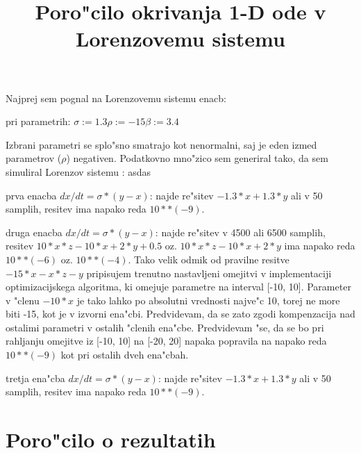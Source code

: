 \documentclass[10pt,a4paper]{article}
\title{Poro"cilo okrivanja 1-D ode v Lorenzovemu sistemu}
\begin{document}
	\maketitle
    
Najprej sem pognal na Lorenzovemu sistemu enacb:

pri parametrih:
$\sigma:=1.3 \rho:=-15 \beta:=3.4$

Izbrani parametri se splo"sno smatrajo kot nenormalni, saj je eden izmed parametrov
($\rho$) negativen.
Podatkovno mno"zico sem generiral tako, da sem simuliral Lorenzov sistemu
:
asdas

prva enacba  $dx/dt = \sigma*(y-x)$: najde re"sitev 
$ -1.3*x + 1.3*y$ ali 
v 50 samplih, resitev ima napako reda $10**(-9)$.


druga enacba  $dx/dt = \sigma*(y-x)$: najde re"sitev v 4500 ali 6500 samplih, resitev 
$10*x*z -10*x +2*y +0.5$ oz. $10*x*z -10*x +2*y$ ima napako
reda $10**(-6)$ oz. $10**(-4)$. Tako velik odmik od pravilne resitve  
$-15*x-x*z-y$ pripisujem trenutno nastavljeni omejitvi v implementaciji optimizacijskega
algoritma, ki omejuje parametre na interval [-10, 10]. Parameter v "clenu $-10*x$ je tako
lahko po absolutni vrednosti najve"c 10, torej ne more biti -15, kot je v izvorni ena"cbi.
Predvidevam, da se zato zgodi kompenzacija nad ostalimi parametri v ostalih "clenih ena"cbe.
Predvidevam "se, da se bo pri rahljanju omejitve iz [-10, 10] na [-20, 20] napaka popravila
na napako reda $10**(-9)$ kot pri ostalih dveh ena"cbah.

tretja ena"cba  $dx/dt = \sigma*(y-x)$: najde re"sitev 
$ -1.3*x + 1.3*y$ ali 
v 50 samplih, resitev ima napako
reda $10**(-9)$.



\section{Poro"cilo o rezultatih}
\newcommand{\asui}{rf-100,10  }
 \newcommand{\asuii}{glm        }
 \newcommand{\asuiii}{glm        }
 \newcommand{\asuiv}{squared+glm}
 \newcommand{\nui}{625}
 \newcommand{\nuii}{562}
 \newcommand{\nuiii}{500}
 \newcommand{\nuiv}{438}
 \newcommand{\eui}{0.00000}
 \newcommand{\euii}{0.00000}
 \newcommand{\euiii}{0.00000}
 \newcommand{\euiv}{0.00000}
 \newcommand{\nti}{625}
 \newcommand{\ntii}{563}
 \newcommand{\ntiii}{500}
 \newcommand{\ntiv}{438}
 \newcommand{\eti}{0.00000}
 \newcommand{\etii}{0.00000}
 \newcommand{\etiii}{0.00000}
 \newcommand{\etiv}{0.00000}
\end{document}
